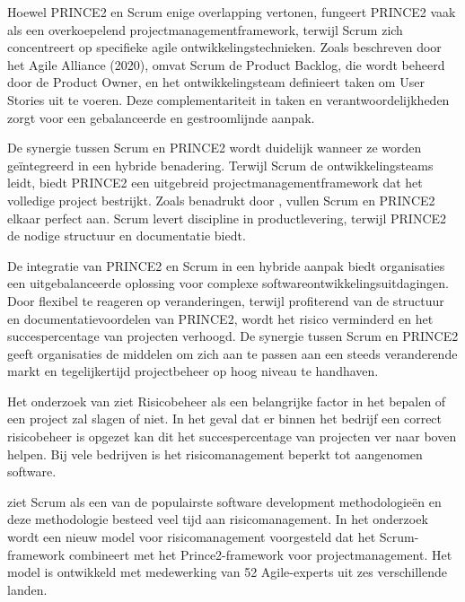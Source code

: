 \documentclass[dutch]{hogent-article}
\begin{document}
Hoewel PRINCE2 en Scrum enige overlapping vertonen, fungeert PRINCE2 vaak als een \linebreak overkoepelend projectmanagementframework, terwijl Scrum zich concentreert op specifieke agile ontwikkelingstechnieken. Zoals beschreven door het Agile Alliance (2020), omvat Scrum de Product Backlog, die wordt beheerd door de Product Owner, en het ontwikkelingsteam definieert taken om User Stories uit te voeren. Deze complementariteit in taken en verantwoordelijkheden zorgt voor een gebalanceerde en gestroomlijnde aanpak.
\newline

De synergie tussen Scrum en PRINCE2 wordt duidelijk wanneer ze worden geïntegreerd in een \linebreak hybride benadering. Terwijl Scrum de ontwikkelingsteams leidt, biedt PRINCE2 een uitgebreid projectmanagementframework dat het volledige project bestrijkt. Zoals benadrukt door \textcite{PoniszewskaMaranda2022}, vullen Scrum en PRINCE2 elkaar perfect aan. Scrum levert discipline in productlevering, terwijl PRINCE2 de nodige structuur en documentatie biedt.
\newline

De integratie van PRINCE2 en Scrum in een hybride aanpak biedt organisaties een uitgebalanceerde oplossing voor complexe softwareontwikkelingsuitdagingen. Door flexibel te reageren op \linebreak veranderingen, terwijl profiterend van de structuur en documentatievoordelen van PRINCE2, wordt het risico verminderd en het succespercentage van projecten verhoogd. De synergie tussen Scrum en PRINCE2 geeft organisaties de middelen om zich aan te passen aan een steeds veranderende markt en tegelijkertijd projectbeheer op hoog niveau te handhaven.
\newline

Het onderzoek van \textcite{Mousaei2018} ziet Risicobeheer als een belangrijke factor in het \linebreak bepalen of een project zal slagen of niet. In het geval dat er binnen het bedrijf een correct risicobeheer is opgezet kan dit het succespercentage van projecten ver naar boven helpen. Bij vele bedrijven is het risicomanagement beperkt tot aangenomen software.
\newline 
\newline 
\newline 
\newline 

\textcite{Mousaei2018} ziet Scrum als een van de populairste software development \linebreak methodologieën en deze methodologie besteed veel tijd aan risicomanagement. In het onderzoek wordt een nieuw model voor risicomanagement voorgesteld dat het Scrum-framework combineert met het Prince2-framework voor projectmanagement. Het model is ontwikkeld met medewerking van 52 Agile-experts uit zes verschillende landen.
\newline
\end{document}

